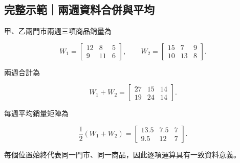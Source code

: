 \documentclass[11pt,a4paper]{article}
\begin{document}
\begin{HandoutWorkedExample}

\subsection{完整示範｜兩週資料合併與平均}\label{ux5b8cux6574ux793aux7bc4ux5169ux9031ux8cc7ux6599ux5408ux4f75ux8207ux5e73ux5747}

甲、乙兩門市兩週三項商品銷量為

\[
W_1=
\begin{bmatrix}
12&8&5\\
9&11&6
\end{bmatrix},\qquad
W_2=
\begin{bmatrix}
15&7&9\\
10&13&8
\end{bmatrix}.
\]

兩週合計為

\[
W_1+W_2
=
\boxed{
\begin{bmatrix}
27&15&14\\
19&24&14
\end{bmatrix}}.
\]

每週平均銷量矩陣為

\[
\frac12(W_1+W_2)
=
\boxed{
\begin{bmatrix}
13.5&7.5&7\\
9.5&12&7
\end{bmatrix}}.
\]

每個位置始終代表同一門市、同一商品，因此逐項運算具有一致資料意義。

\end{HandoutWorkedExample}
\end{document}
